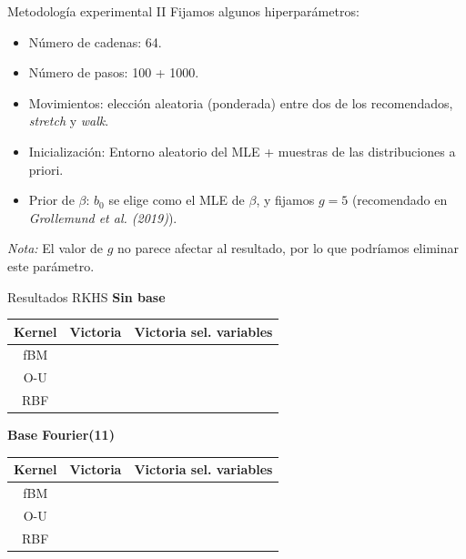 \documentclass[10pt, spanish, professionalfonts]{beamer}
\newcommand{\cmark}{\ding{51}}%
\newcommand{\xmark}{\ding{55}}%
\begin{document}
\begin{frame}{Metodología experimental II}
  Fijamos algunos hiperparámetros:
  \begin{itemize}
    \item Número de cadenas: 64.
    \item Número de pasos: 100 + 1000.
    \item Movimientos: elección aleatoria (ponderada) entre dos de los recomendados, \textit{stretch} y \textit{walk}.
    \item Inicialización: Entorno aleatorio del MLE + muestras de las distribuciones a priori.
    \item Prior de \(\beta\): \(b_0\) se elige como el MLE de \(\beta\), y fijamos \(g=5\) (recomendado en \textit{Grollemund et al. (2019)}).
  \end{itemize}
  \vspace{1em}

  \textit{Nota:} El valor de \(g\) no parece afectar al resultado, por lo que podríamos eliminar este parámetro.
\end{frame}

\begin{frame}{Resultados RKHS}
\textbf{Sin base}
  \begin{table}
    \begin{tabular}{c|cc}
      Kernel & Victoria & Victoria sel. variables \\ \hline
      fBM & \cmark & \cmark\\
      O-U & \cmark & \cmark\\
      RBF & \cmark & \cmark
    \end{tabular}
  \end{table}

  \textbf{Base Fourier(11)}
  \begin{table}
    \begin{tabular}{c|cc}
      Kernel & Victoria & Victoria sel. variables \\ \hline
      fBM & \cmark &  \cmark\\
      O-U & \cmark & \xmark\\
      RBF & \cmark & \cmark
    \end{tabular}
  \end{table}
\end{frame}
\end{document}
